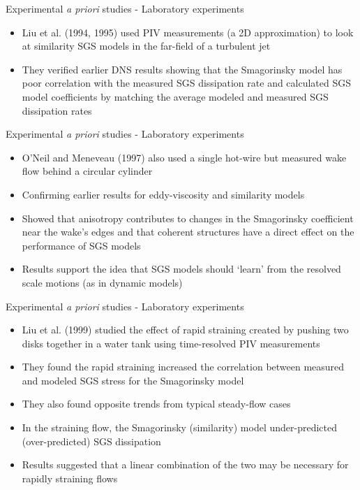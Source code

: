 
\begin{frame}{Experimental {\it a priori} studies - Laboratory experiments}
\begin{itemize}
	\item Liu et al. (1994, 1995) used PIV measurements (a 2D approximation) to look at similarity SGS models in the far-field of a turbulent jet
	\item They verified earlier DNS results showing that the Smagorinsky model has poor correlation with the measured SGS dissipation rate and calculated SGS model coefficients by matching the average modeled and measured SGS dissipation rates
	\end{itemize}
\end{frame}


\begin{frame}{Experimental {\it a priori} studies - Laboratory experiments}
\begin{itemize}
	\item O'Neil and Meneveau (1997) also used a single hot-wire but measured wake flow behind a circular cylinder
	\item Confirming earlier results for eddy-viscosity and similarity models
	\item Showed that anisotropy contributes to changes in the Smagorinsky coefficient near the wake's edges and that coherent structures have a direct effect on the performance of SGS models
	\item Results support the idea that SGS models should `learn' from the resolved scale motions (as in dynamic models)
	\end{itemize}
\end{frame}


\begin{frame}{Experimental {\it a priori} studies - Laboratory experiments}
\begin{itemize}
	\item Liu et al. (1999) studied the effect of rapid straining created by pushing two disks together in a water tank using time-resolved PIV measurements
	\item They found the rapid straining increased the correlation between measured and modeled SGS stress for the Smagorinsky model
	\item They also found opposite trends from typical steady-flow cases
	\item In the straining flow, the Smagorinsky (similarity) model under-predicted (over-predicted) SGS dissipation
	\item Results suggested that a linear combination of the two may be necessary for rapidly straining flows
	\end{itemize}
\end{frame}

